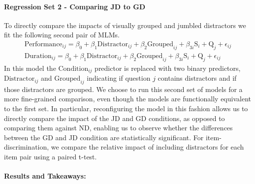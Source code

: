 \documentclass[authorversion,nonacm]{acmart}
\begin{document}
\noindent\paragraph{Regression Set 2 - Comparing JD to GD}
To directly compare the impacts of visually grouped and jumbled distractors we fit 
the following second pair of MLMs.
\begin{align*}
  \text{Performance}_{ij} = \beta_0 + \beta_1\text{Distractor}_{ij} + \beta_2\text{Grouped}_{ij} + \beta_{3i}\text{S}_{i} + \text{Q}_{j} + \epsilon_{ij}\\
  \text{Duration}_{ij} = \beta_0 + \beta_1\text{Distractor}_{ij} + \beta_2\text{Grouped}_{ij} + \beta_{3i}\text{S}_{i} + \text{Q}_{j} + \epsilon_{ij} 
\end{align*}
In this model the $\text{Condition}_{ij}$ predictor is replaced with two binary
predictors, $\text{Distractor}_{ij}$ and $\text{Grouped}_{ij}$  indicating if
question $j$ contains distractors and if those distractors are grouped. We
choose to run this second set of models for a more fine-grained comparison,
even though the models are functionally equivalent to the first set. In
particular, reconfiguring the model in this fashion allows us to directly
compare the impact of the JD and GD conditions, as opposed to comparing them
against ND, enabling us to observe whether the differences between the GD and
JD condition are statistically significant. For item-discrimination, we compare the relative impact of including
distractors for each item pair using a paired t-test.

\paragraph{Results and Takeaways:}
\end{document}
